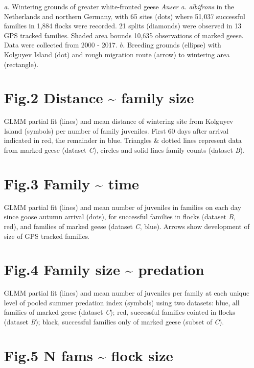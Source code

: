 \documentclass[]{article}
\date{}
\begin{document}
\emph{a.} Wintering grounds of greater white-fronted geese \emph{Anser
a. albifrons} in the Netherlands and northern Germany, with 65 sites
(dots) where 51,037 successful families in 1,884 flocks were recorded.
21 splits (diamonds) were observed in 13 GPS tracked families. Shaded
area bounds 10,635 observations of marked geese. Data were collected
from 2000 - 2017. \emph{b.} Breeding grounds (ellipse) with Kolguyev
Island (dot) and rough migration route (arrow) to wintering area
(rectangle).

\section{Fig.2 Distance \textasciitilde{} family
size}\label{fig.2-distance-family-size}

GLMM partial fit (lines) and mean distance of wintering site from
Kolguyev Island (symbols) per number of family juveniles. First 60 days
after arrival indicated in red, the remainder in blue. Triangles \&
dotted lines represent data from marked geese (dataset \emph{C}),
circles and solid lines family counts (dataset \emph{B}).

\section{Fig.3 Family \textasciitilde{} time}\label{fig.3-family-time}

GLMM partial fit (lines) and mean number of juveniles in families on
each day since goose autumn arrival (dots), for successful families in
flocks (dataset \emph{B}, red), and families of marked geese (dataset
\emph{C}, blue). Arrows show development of size of GPS tracked
families.

\section{Fig.4 Family size \textasciitilde{}
predation}\label{fig.4-family-size-predation}

GLMM partial fit (lines) and mean number of juveniles per family at each
unique level of pooled summer predation index (symbols) using two
datasets: blue, all families of marked geese (dataset \emph{C}); red,
successful families cointed in flocks (dataset \emph{B}); black,
successful families only of marked geese (subset of \emph{C}).

\section{Fig.5 N fams \textasciitilde{} flock
size}\label{fig.5-n-fams-flock-size}
\end{document}
